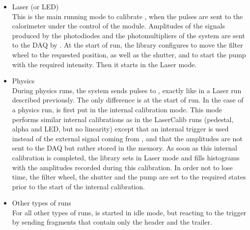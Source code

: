 \begin{itemize}
\item{Laser (or LED)}~\\
This is the main running mode to calibrate \tilecal{}, when the \las{} pulses are sent to the
calorimeter under the control of the \shaft{} module. Amplitudes of the signals produced by the 
photodiodes and the photomultipliers of the \lasii{} system are sent to the \atlas{} DAQ by 
\lascar{}. At the start of run, the \lasmodule{} library configures \lascar{} to move the filter
wheel to the requested position, as well as the shutter, and to start the \las{} pump with the 
required intensity. Then it starts \lascar{} in the Laser mode.

\item{Physics}~\\
During physics runs, the \lasii{} system sends \las{} pulses to \tilecal{}, exactly like in
a Laser run described previously. The only difference is at the start of run. In the case of
a physics run, \lascar{} is first put in the internal calibration mode. This mode performs
similar internal calibrations as in the LaserCalib runs (pedestal, alpha and LED, but no
linearity) except that an internal trigger is used instead of the external signal coming from
\shaft{}, and that the amplitudes are not sent to the \atlas{} DAQ but rather stored in the 
\lascar{} memory. As soon as this internal calibration is completed, the \lasmodule{} library
sets \lascar{} in Laser mode and fills histograms with the amplitudes recorded during this
calibration. In order not to lose time, the filter wheel, the shutter and the \las{} pump
are set to the required states prior to the start of the internal calibration.

\item{Other types of runs}~\\
For all other types of runs, \lascar{} is started in idle mode, but reacting to the
trigger by sending fragments that contain only the header and the trailer.


\end{itemize}
